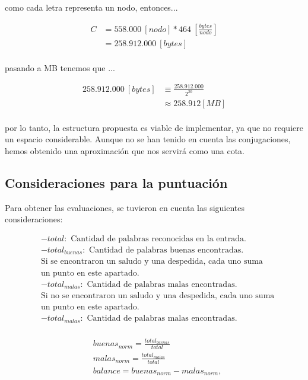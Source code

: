 \documentclass[10pt,times,twocolumn]{article}
\begin{document}
como cada letra representa un nodo, entonces...

\[
\begin{aligned}
C & = 558{.}000 \: \left[nodo\right] * 464 \: \left[\frac{bytes}{nodo}\right]\\
& = 258{.}912{.}000 \: \left[bytes\right]\\
&
\end{aligned}
\]

pasando a MB tenemos que ...

\[
\begin{aligned}
258{.}912{.}000 \: \left[bytes\right] & \equiv \frac{258{.}912{.}000}{2^{20}}\\
& \approx \num{258.912} \left[MB\right]\\
&
\end{aligned}
\]

por lo tanto, la estructura propuesta es viable de implementar, ya que no requiere un espacio considerable.
Aunque no se han tenido en cuenta las conjugaciones, hemos obtenido una aproximación que nos servirá como una cota.

\subsection{Consideraciones para la puntuación}
Para obtener las evaluaciones, se tuvieron en cuenta las siguientes consideraciones:

\[
\begin{aligned}
& - total: \text{ Cantidad de palabras reconocidas en la entrada.} \\
& - total_{buenas}: \text{ Cantidad de palabras buenas encontradas.}\\
& \text{Si se encontraron un saludo y una despedida, cada uno suma}\\
& \text{un punto en este apartado.} \\
& - total_{malas}: \text{ Cantidad de palabras malas encontradas.}\\
& \text{Si no se encontraron un saludo y una despedida, cada uno suma}\\
& \text{un punto en este apartado.} \\
& - total_{malas}: \text{ Cantidad de palabras malas encontradas.}\\
\end{aligned}
\]

\[
\begin{aligned}
& buenas_{norm}=\frac{total_{buenas}}{total}\\
& malas_{norm}=\frac{total_{malas}}{total}\\
& balance = buenas_{norm} - malas_{norm},
\end{aligned}
\]
\end{document}

